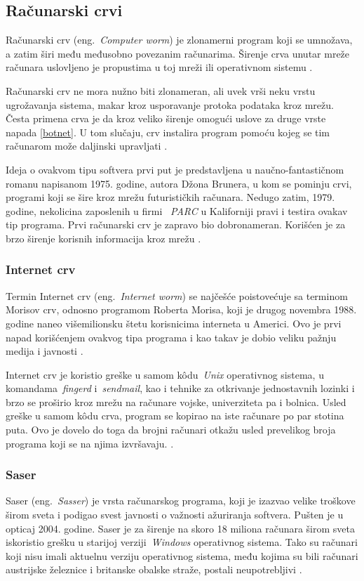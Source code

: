 \documentclass[a4paper]{article}
\begin{document}
\subsection{Računarski crvi}
Računarski crv (eng.~{\em Computer worm}) je zlonamerni program koji se umnožava, a zatim širi među međusobno povezanim računarima. Širenje crva unutar mreže računara uslovljeno je propustima u toj mreži ili operativnom sistemu \cite{norton_worm, ethics}.

Računarski crv ne mora nužno biti zlonameran, ali uvek vrši neku vrstu ugrožavanja sistema, makar kroz usporavanje protoka podataka kroz mrežu. Česta primena crva je da kroz veliko širenje omogući uslove za druge vrste napada \ref{botnet}. U tom slučaju, crv instalira program pomoću kojeg se tim računarom može daljinski upravljati \cite{ethics}.

Ideja o ovakvom tipu softvera prvi put je predstavljena u naučno-fantastičnom romanu napisanom 1975. godine, autora Džona Brunera, u kom se pominju crvi, programi koji se šire kroz mrežu futurističkih računara. Nedugo zatim, 1979. godine, nekolicina zaposlenih u firmi ~{\em PARC} u Kaliforniji pravi i testira ovakav tip programa.
Prvi računarski crv je zapravo bio dobronameran. Korišćen je za brzo širenje korisnih informacija kroz mrežu \cite{internet_worm}. 


\subsubsection{Internet crv}

Termin Internet crv  (eng.~{\em Internet worm}) se najčešće poistovećuje sa terminom Morisov crv, odnosno programom Roberta Morisa, koji je drugog novembra 1988. godine naneo višemilionsku štetu korisnicima interneta u Americi. Ovo je prvi napad korišćenjem ovakvog tipa programa i kao takav je dobio veliku pažnju medija i javnosti \cite{ethics}.

Internet crv je koristio greške u samom kôdu~{\em Unix} operativnog sistema, u komandama~{\em fingerd} i~{\em sendmail}, kao i tehnike za otkrivanje jednostavnih lozinki i brzo se proširio kroz mrežu na računare vojske, univerziteta pa i bolnica. Usled greške u samom kôdu crva, program se kopirao na iste računare po par stotina puta. Ovo je dovelo do toga da brojni računari otkažu usled prevelikog broja programa koji se na njima izvršavaju. \cite{internet_worm}.


\subsubsection{Saser}
Saser (eng.~{\em Sasser}) je vrsta računarskog programa, koji je izazvao velike troškove širom sveta i podigao svest javnosti o važnosti ažuriranja softvera. Pušten je u opticaj 2004. godine. Saser je za širenje na skoro 18 miliona računara širom sveta iskoristio grešku u starijoj verziji~{\em Windows} operativnog sistema. Tako su računari koji nisu imali aktuelnu verziju operativnog sistema, među kojima su bili računari austrijske železnice i britanske obalske straže, postali neupotrebljivi \cite{ethics}.
\end{document}
